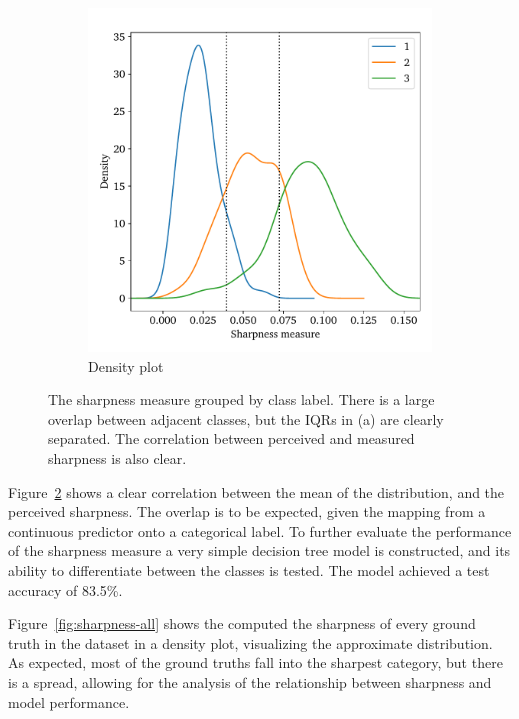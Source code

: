 \begin{figure}[htbp]
\begin{subfigure}[t]{0.49\textwidth}
  \includegraphics[width=\textwidth]{figs/method/qden.pdf}
  \caption{Density plot}\label{fig:sharpness-qden}
\end{subfigure}
  \caption[Sharpness measure separability]{The sharpness measure grouped by class label.
There is a large overlap between adjacent classes, but the IQRs in (a) are clearly separated.
The correlation between perceived and measured sharpness is also clear.}\label{fig:sharpness}
\end{figure}

Figure~\ref{fig:sharpness} shows a clear correlation between the mean of the distribution, and the perceived sharpness.
The overlap is to be expected, given the mapping from a continuous predictor onto a categorical label.
To further evaluate the performance of the sharpness measure a very simple decision tree model is constructed, and its ability to differentiate between the classes is tested.
The model achieved a test accuracy of 83.5\%.

Figure~\ref{fig:sharpness-all} shows the computed the sharpness of every ground truth in the dataset in a density plot, visualizing the approximate distribution.
As expected, most of the ground truths fall into the sharpest category, but there is a spread, allowing for the analysis of the relationship between sharpness and model performance.

